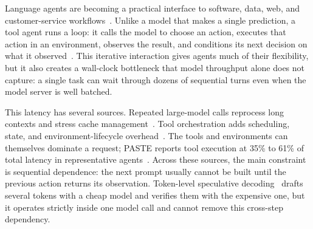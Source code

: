Language agents are becoming a practical interface to software, data, web, and customer-service workflows~\citep{xu2026evolutiontoolusellm, ling2026agentskillsdatadrivenanalysis,
wei2026agenticreasoninglargelanguage}. 
Unlike a model that makes a single prediction, a tool agent runs a loop: it calls the model to choose an action, executes that action in an environment, observes the result, and conditions its next decision on what it observed~\citep{react-2023}. 
This iterative interaction gives agents much of their flexibility, but it also creates a wall-clock bottleneck that model throughput alone does not capture: a single task can wait through dozens of sequential turns even when the model server is well batched.

This latency has several sources. Repeated large-model calls reprocess long contexts and stress cache management~\citep{kvflow-2025}. Tool orchestration adds scheduling, state, and environment-lifecycle overhead~\citep{thunderagent-2026}. The tools and environments can themselves dominate a request; PASTE reports tool execution at 35\% to 61\% of total latency in representative agents~\citep{paste-2026}. 
Across these sources, the main constraint is sequential dependence: the next prompt usually cannot be built until the previous action returns its observation. 
Token-level speculative decoding~\citep{leviathan-2023-specdec} drafts several tokens with a cheap model and verifies them with the expensive one, but it operates strictly inside one model call and cannot remove this cross-step dependency.

